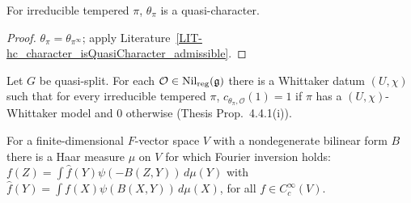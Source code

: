 \begin{theorem}
\label{hc_character_isQuasiCharacter}
\leanok
{}
For irreducible tempered $\pi$, $\theta_\pi$ is a quasi-character.
\end{theorem}
\begin{proof}
\leanok
$\theta_\pi=\theta_{\pi^\infty}$; apply Literature~\ref{LIT-hc_character_isQuasiCharacter_admissible}.
\end{proof}

\begin{literature}
\label{LIT-rodier_germ_one}
\leanok
{}
Let $G$ be quasi-split. For each $\mathcal O\in\mathrm{Nil}_{\mathrm{reg}}(\mathfrak g)$ there is a Whittaker datum $(U,\chi)$
such that for every irreducible tempered $\pi$, $c_{\theta_\pi,\mathcal O}(1)=1$ if $\pi$ has a
$(U,\chi)$-Whittaker model and $0$ otherwise (Thesis Prop.~4.4.1(i)).

\end{literature}

\begin{literature}
\label{LIT-exists_isSelfDual}
\leanok
For a finite-dimensional $F$-vector space $V$ with a nondegenerate bilinear form $B$ there is a Haar measure
$\mu$ on $V$ for which Fourier inversion holds: $f(Z)=\int\hat f(Y)\psi(-B(Z,Y))\,d\mu(Y)$ with
$\hat f(Y)=\int f(X)\psi(B(X,Y))\,d\mu(X)$, for all $f\in C_c^\infty(V)$.

\end{literature}

